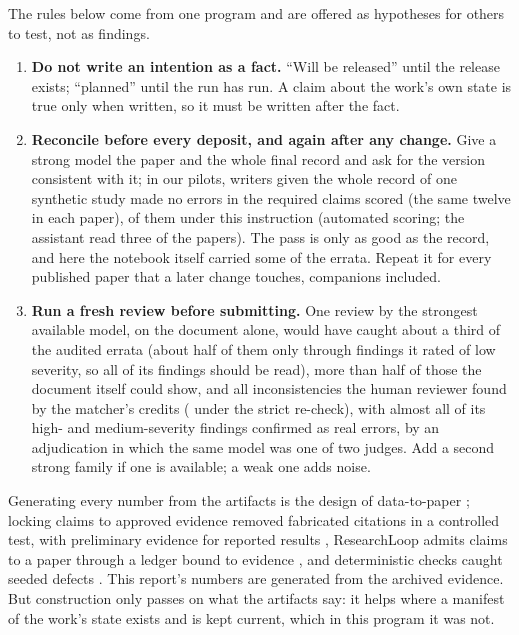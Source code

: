 \documentclass[11pt]{article}
\begin{document}
The rules below come from one program and are offered as hypotheses for others to test, not as findings.

\begin{enumerate}\setlength\itemsep{0pt}
\item \textbf{Do not write an intention as a fact.} ``Will be released'' until the release exists; ``planned'' until the run has
run. A claim about the work's own state is true only when written, so it must be written after the fact.
\item \textbf{Reconcile before every deposit, and again after any change.} Give a strong model the paper and the whole final
record and ask for the version consistent with it; in our pilots, writers given the whole record of one synthetic study made no errors in the
\PilotFacts{} required claims scored (the same twelve in each paper), \PilotFactsFull{} of them under this instruction (automated scoring; the assistant read three of the papers). The pass is only as good as the record, and here the notebook itself carried some
of the errata. Repeat it for every published paper
that a later change touches, companions included.
\item \textbf{Run a fresh review before submitting.} One review by the strongest available model, on the document alone, would
have caught about a third of the audited errata (about half of them only through findings it rated of low severity, so
all of its findings should be read), more than half of those the document itself could show, and all \Njudge{}
inconsistencies the human reviewer found by the matcher's credits (\StrictJudgeOpusA{} under the strict re-check), with almost all of its
high- and medium-severity findings confirmed as real errors, by an adjudication in which the same model was one of two judges. Add a
second strong family if one is available; a weak one adds noise.
\end{enumerate}
Generating every number from the artifacts is the design of data-to-paper \citep{ifargan2024datatopaper}; locking claims to
approved evidence removed fabricated citations in a controlled test, with preliminary evidence for reported results
\citep{jha2026paperpilot}, ResearchLoop admits claims to a paper through a ledger bound to evidence \citep{xia2026researchloop}, and
deterministic checks caught seeded defects \citep{nam2026gates}. This report's numbers are generated from the archived evidence. But construction only passes on what the
artifacts say: it helps where a manifest of the work's state exists and is kept current, which in this program it was not.
\end{document}
